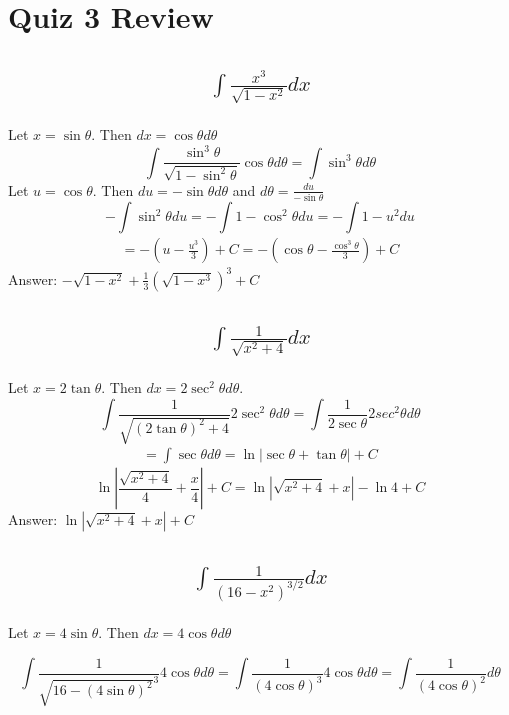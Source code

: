 \documentclass{article}
\begin{document}
\newpage
\section{Quiz 3 Review}
\subsection{
	\begin{align*}
		\int{\frac{x^3}{\sqrt{1 - x^2}} dx}
	\end{align*}
}

Let $x=\sin{\theta}$. Then $dx = \cos{\theta}d\theta$
\[ \int \frac{ \sin^3{\theta}}{\sqrt{1-\sin^2{\theta}}} \cos{\theta} d\theta  = \int \sin^3{\theta} d\theta \]
Let $u = \cos{\theta}$. Then $du = -\sin{\theta} d\theta$ and $d\theta = \frac{du}{-\sin{\theta}}$
\[ - \int \sin^2{\theta} du = - \int 1- \cos^2{\theta} du = -\int 1 - u^2 du  \]
\begin{align*}
	= -(u - \frac{u^3}{3}) +C = -( \cos {\theta} - \frac{\cos^3{\theta}}{3})+ C
\end{align*}
Answer: $-\sqrt{1-x^2} + \frac{1}{3} (\sqrt{1-x^3})^3 +C$

\subsection{
	\begin{align*}
		\int{\frac{1}{\sqrt{x^2 + 4}} dx}
	\end{align*}
}

Let $x= 2 \tan{\theta}$. Then $dx = 2 \sec^2{\theta}d\theta$. 
\[ \int \frac{1}{\sqrt {(2\tan{\theta})^2 +4} }2\sec^2{\theta} d\theta = \int \frac{1}{2\sec{\theta}} 2 sec^2{\theta} d\theta \]
\begin{align*}
	= \int \sec{\theta} d\theta = \ln{|\sec{\theta} +\tan {\theta}| }+C
\end{align*}
\[\ln{|\frac{\sqrt{x^2 +4}}{4} +\frac{x}{4}| }+C = \ln{|\sqrt{x^2 +4} +x| } - \ln{4}+C\]
Answer: $\ln{|\sqrt{x^2 +4} +x| } +C$

\subsection{
	\begin{align*}
		\int{\frac{1}{(16 - x^2)^{3/2}} dx}
	\end{align*}
}
Let $x = 4\sin{\theta}$. Then $dx = 4\cos{\theta} d\theta$

\[ \int \frac{1}{\sqrt{16 - (4\sin{\theta})^2}^3} 4 \cos{\theta} d\theta = \int \frac{1}{(4\cos{\theta})^3} 4 \cos{\theta} d\theta = \int \frac{1}{(4\cos{\theta})^2} d\theta \]
\end{document}
